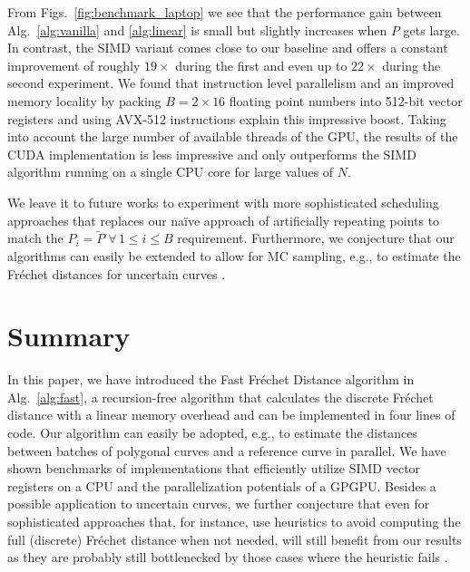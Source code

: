 From Figs.~\ref{fig:benchmark_laptop} we see that the performance gain between Alg.~\ref{alg:vanilla} and \ref{alg:linear} is small but slightly increases when $P$ gets large.
In contrast, the SIMD variant comes close to our baseline and offers a constant improvement of roughly $19\times$ during the first and even up to $22\times$ during the second experiment.
We found that instruction level parallelism and an improved memory locality by packing $B=2 \times 16$ floating point numbers into 512-bit vector registers and using AVX-512 instructions explain this impressive boost.
Taking into account the large number of available threads of the GPU, the results of the CUDA implementation is less impressive and only outperforms the SIMD algorithm running on a single CPU core for large values of $N$.

We leave it to future works to experiment with more sophisticated scheduling approaches that replaces our na\"ive approach of artificially repeating points to match the $P_i = \tilde P \; \forall \, 1 \le i \le B$ requirement.
Furthermore, we conjecture that our algorithms can easily be extended to allow for MC sampling, e.g., to estimate the Fr\'echet distances for uncertain curves \citep{buchin23}.

\section{Summary}
\label{sec:summary}
In this paper, we have introduced the Fast Fr\'echet Distance algorithm in Alg.~\ref{alg:fast}, a recursion-free algorithm that calculates the discrete Fr\'echet distance with a linear memory overhead and can be implemented in four lines of code.
Our algorithm can easily be adopted, e.g., to estimate the distances between batches of polygonal curves and a reference curve in parallel.
We have shown benchmarks of implementations that efficiently utilize SIMD vector registers on a CPU and the parallelization potentials of a GPGPU.
Besides a possible application to uncertain curves, we further conjecture that even for sophisticated approaches that, for instance, use heuristics to avoid computing the full (discrete) Fr\'echet distance when not needed, will still benefit from our results as they are probably still bottlenecked by those cases where the heuristic fails \citep{buchin23,baldus17,buchin17b,duetsch17}.

